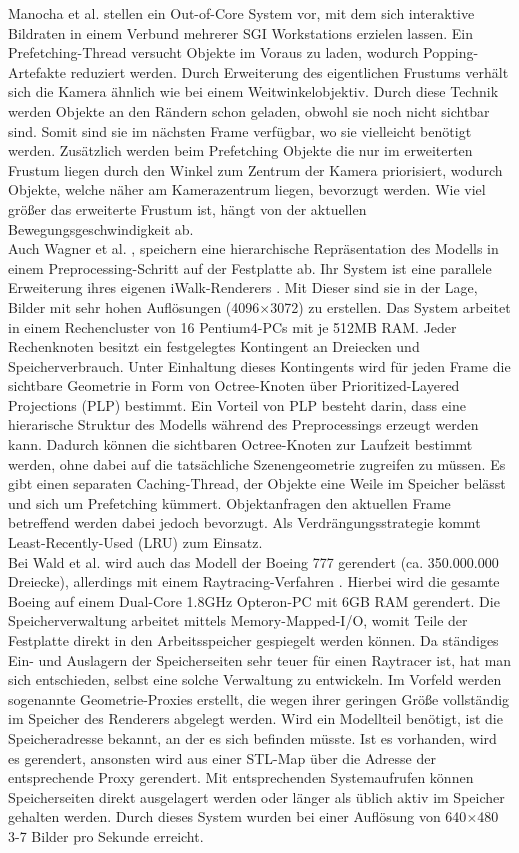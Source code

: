 Manocha et al. \cite{manocha} stellen ein Out-of-Core System vor, mit dem sich interaktive Bildraten in einem Verbund mehrerer SGI Workstations erzielen lassen. Ein Prefetching-Thread versucht Objekte im Voraus zu laden, wodurch Popping-Artefakte reduziert werden. Durch Erweiterung des eigentlichen Frustums verhält sich die Kamera ähnlich wie bei einem Weitwinkelobjektiv. Durch diese Technik werden Objekte an den Rändern schon geladen, obwohl sie noch nicht sichtbar sind. Somit sind sie im nächsten Frame verfügbar, wo sie vielleicht benötigt werden. Zusätzlich werden beim Prefetching Objekte die nur im erweiterten Frustum liegen durch den Winkel zum Zentrum der Kamera priorisiert, wodurch Objekte, welche näher am Kamerazentrum liegen, bevorzugt werden. Wie viel größer das erweiterte Frustum ist, hängt von der aktuellen Bewegungsgeschwindigkeit ab.\\
Auch Wagner et al. \cite{wagner1}, \cite{wagner2} speichern eine hierarchische Repräsentation des Modells in einem Preprocessing-Schritt auf der Festplatte ab. Ihr System ist eine parallele Erweiterung ihres eigenen iWalk-Renderers \cite{iwalk}. Mit Dieser sind sie in der Lage, Bilder mit sehr hohen Auflösungen (4096$\times$3072) zu erstellen. Das System arbeitet in einem Rechencluster von 16 Pentium4-PCs mit je 512MB RAM. Jeder Rechenknoten besitzt ein festgelegtes Kontingent an Dreiecken und Speicherverbrauch. Unter Einhaltung dieses Kontingents wird für jeden Frame die sichtbare Geometrie in Form von Octree-Knoten über Prioritized-Layered Projections (PLP) \cite{plp} bestimmt. Ein Vorteil von PLP besteht darin, dass eine hierarische Struktur des Modells während des Preprocessings erzeugt werden kann. Dadurch können die sichtbaren Octree-Knoten zur Laufzeit bestimmt werden, ohne dabei auf die tatsächliche Szenengeometrie zugreifen zu müssen. Es gibt einen separaten Caching-Thread, der Objekte eine Weile im Speicher belässt und sich um Prefetching kümmert. Objektanfragen den aktuellen Frame betreffend werden dabei jedoch bevorzugt. Als Verdrängungsstrategie kommt Least-Recently-Used (LRU) zum Einsatz.\\
Bei Wald et al. \cite{wald} wird auch das Modell der Boeing 777 gerendert (ca. 350.000.000 Dreiecke), allerdings mit einem Raytracing-Verfahren \cite{RTR3}. Hierbei wird die gesamte Boeing auf einem Dual-Core 1.8GHz Opteron-PC mit 6GB RAM gerendert. Die Speicherverwaltung arbeitet mittels Memory-Mapped-I/O, womit Teile der Festplatte direkt in den Arbeitsspeicher gespiegelt werden können. Da ständiges Ein- und Auslagern der Speicherseiten sehr teuer für einen Raytracer ist, hat man sich entschieden, selbst eine solche Verwaltung zu entwickeln. Im Vorfeld werden sogenannte Geometrie-Proxies erstellt, die wegen ihrer geringen Größe vollständig im Speicher des Renderers abgelegt werden. Wird ein Modellteil benötigt, ist die Speicheradresse bekannt, an der es sich befinden müsste. Ist es vorhanden, wird es gerendert, ansonsten wird aus einer STL-Map über die Adresse der entsprechende Proxy gerendert. Mit entsprechenden Systemaufrufen können Speicherseiten direkt ausgelagert werden oder länger als üblich aktiv im Speicher gehalten werden. Durch dieses System wurden bei einer Auflösung von 640$\times$480 3-7 Bilder pro Sekunde erreicht.

%
